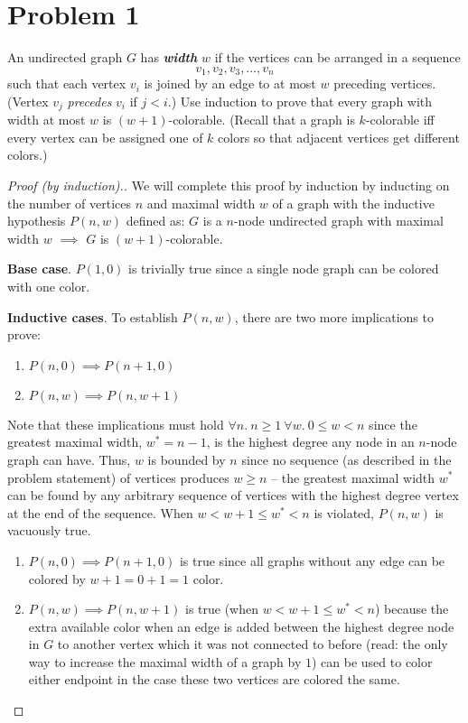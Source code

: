 \documentclass[a4paper]{article}
\begin{document}
	\section{Problem 1}%
	\label{sec:Problem 1}

	An undirected graph $G$ has \textbf{\textit{width}} $w$ if the vertices can
	be arranged in a sequence $$ v_{1}, v_{2}, v_{3}, \ldots, v_{n} $$ such that
	each vertex $v_{i}$ is joined by an edge to at most $w$ preceding vertices.
	(Vertex $v_{j}$ \textit{precedes} $v_{i}$ if $j < i$.) Use induction to prove
	that every graph with width at most $w$ is $(w+1)$-colorable.  (Recall that a
	graph is $k$-colorable iff every vertex can be assigned one of $k$ colors so
	that adjacent vertices get different colors.)

	\begin{proof}[Proof (by induction).]

		We will complete this proof by induction by inducting on the number of
		vertices $n$ and maximal width $w$ of a graph with the inductive
		hypothesis $P(n, w)$ defined as: $G$ is a $n$-node undirected graph with
		maximal width $w$ $\implies$ $G$ is $(w+1)$-colorable.

		\textbf{Base case}. $P(1, 0)$ is trivially true since a single node graph
		can be colored with one color.

		\textbf{Inductive cases}. To establish $P(n, w)$, there are two more implications to prove:
		\begin{enumerate}
			\item $P(n, 0) \implies P(n+1, 0)$
			\item $P(n, w) \implies P(n, w+1)$
		\end{enumerate}

		Note that these implications must hold $\forall n.\ n \geq 1\ \forall w.\ 0
		\leq w < n$ since the greatest maximal width, $w^{*} = n-1$, is the highest
		degree any node in an $n$-node graph can have. Thus, $w$ is bounded by $n$ since
		no sequence (as described in the problem statement) of vertices produces
		$w \geq n$ -- the greatest maximal width $w^{*}$ can be found by any
		arbitrary sequence of vertices with the highest degree vertex at the end of
		the sequence. When $w < w+1 \leq w^{*} < n$ is violated, $P(n, w)$ is vacuously true.

		\begin{enumerate}

			\item $P(n, 0) \implies P(n+1, 0)$ is true since all graphs without any
				edge can be colored by $w+1 = 0+1 = 1$ color.

			\item $P(n, w) \implies P(n, w+1)$ is true (when $w < w+1 \leq w^{*} <
				n$) because the extra available color when an edge is added between the
				highest degree node in $G$ to another vertex which it was not connected
				to before (read: the only way to increase the maximal width of a graph
				by $1$) can be used to color either endpoint in the case these two
				vertices are colored the same.

		\end{enumerate}


	\end{proof}
\end{document}
